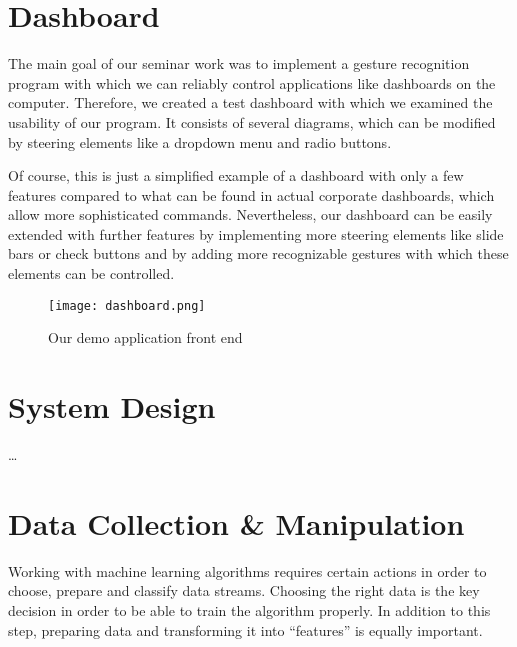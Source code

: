 
\chapter{Dashboard}
\label{ch:Dashboard}

The main goal of our seminar work was to implement a gesture recognition program with which we can reliably control applications like dashboards on the computer.
Therefore, we created a test dashboard with which we examined the usability of our program.
It consists of several diagrams, which can be modified by steering elements like a dropdown menu and radio buttons.

Of course, this is just a simplified example of a dashboard with only a few features compared to what can be found in actual corporate dashboards, which allow more sophisticated commands.
Nevertheless, our dashboard can be easily extended with further features by implementing more steering elements like slide bars or check buttons and by adding more recognizable gestures with which these elements can be controlled.  

\begin{figure}[htp]
\begin{center}
  \texttt{[image: dashboard.png]}
\caption{Our demo application front end}
\end{center}
\end{figure} 


\chapter{System Design}
\label{ch:SystemDesign}

\dots


\chapter{Data Collection \& Manipulation}
\label{ch:DataCollection}

Working  with  machine  learning  algorithms  requires  certain  actions  in  order  to choose, prepare and classify data streams.
Choosing the right data is the key decision in order to be able to train the  algorithm properly.
In addition to this  step, preparing data and transforming it into “features” is equally important. 

